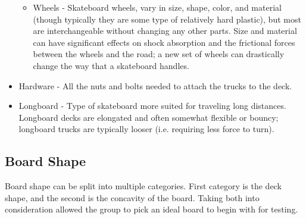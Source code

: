\documentclass[letterpaper,12pt]{article}
\begin{document}
\begin{itemize}
\begin{itemize}
\item Wheels - Skateboard wheels, vary in size, shape, color, and material (though typically they are some type of relatively hard plastic), but most are interchangeable without changing any other parts. Size and material can have significant effects on shock absorption and the frictional forces between the wheels and the road; a new set of wheels can drastically change the way that a skateboard handles.
\end{itemize}
\item Hardware - All the nuts and bolts needed to attach the trucks to the deck.
\item Longboard - Type of skateboard more suited for traveling long distances. Longboard decks are elongated and often somewhat flexible or bouncy; longboard trucks are typically looser (i.e. requiring less force to turn).
\end{itemize}

\subsection{Board Shape}
Board shape can be split into multiple categories. First category is the deck shape, and the second is the concavity of the board. Taking both into consideration allowed the group to pick an ideal board to begin with for testing.
\end{document}
